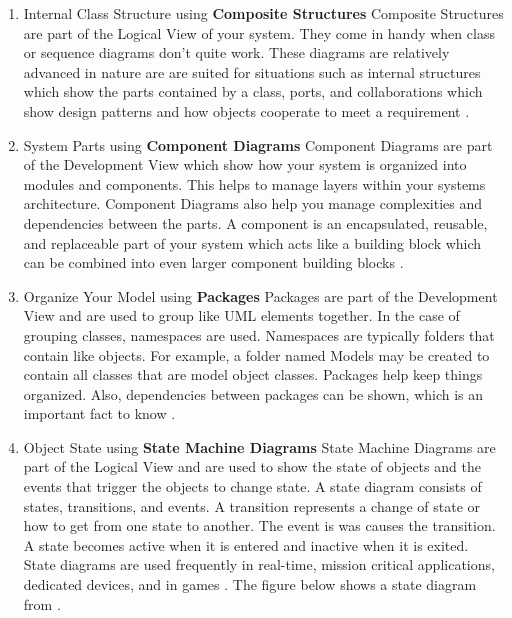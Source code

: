 \documentclass{acm_proc_article-sp}
\begin{document}
\begin{enumerate}
	\item Internal Class Structure using \textbf{Composite Structures}
	\newline
	Composite Structures are part of the Logical View of your system. They come in handy when class or sequence diagrams don't quite work. These diagrams are relatively advanced in nature are are suited for situations such as internal structures which show the parts contained by a class, ports, and collaborations which show design patterns and how objects cooperate to meet a requirement \cite{Lamport:UML}.
	\item System Parts using \textbf{Component Diagrams}
	\newline
	Component Diagrams are part of the Development View which show how your system is organized into modules and components. This helps to manage layers within your systems architecture. Component Diagrams also help you manage complexities and dependencies between the parts. A component is an encapsulated, reusable, and replaceable part of your system which acts like a building block which can be combined into even larger component building blocks \cite{Lamport:UML}.
	\item Organize Your Model using \textbf{Packages}
	\newline
	Packages are part of the Development View and are used to group like UML elements together. In the case of grouping classes, namespaces are used. Namespaces are typically folders that contain like objects. For example, a folder named Models may be created to contain all classes that are model object classes. Packages help keep things organized. Also, dependencies between packages can be shown, which is an important fact to know \cite{Lamport:UML}.
	\item Object State using \textbf{State Machine Diagrams}
	\newline
	State Machine Diagrams are part of the Logical View and are used to show the state of objects and the events that trigger the objects to change state. A state diagram consists of states, transitions, and events. A transition represents a change of state or how to get from one state to another. The event is was causes the transition. A state becomes active when it is entered and inactive when it is exited. State diagrams are used frequently in real-time, mission critical applications, dedicated devices, and in games \cite{Lamport:UML}.
	\newline
	The figure below shows a state diagram from \cite{Lamport:UML}.
	\newline

\end{enumerate}
\end{document}
